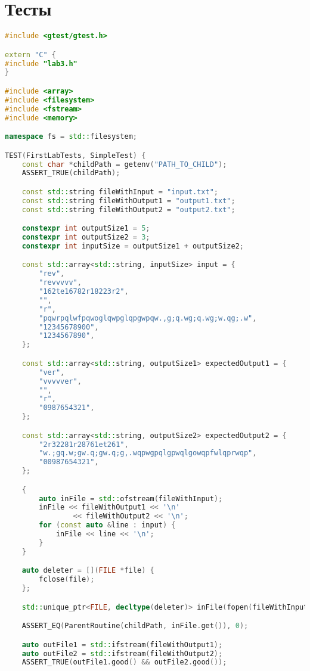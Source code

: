 \documentclass[a4paper, 12pt]{article}
\begin{document}
\newpage
\section{Тесты}
\begin{lstlisting}[language=C++]
#include <gtest/gtest.h>

extern "C" {
#include "lab3.h"
}

#include <array>
#include <filesystem>
#include <fstream>
#include <memory>

namespace fs = std::filesystem;

TEST(FirstLabTests, SimpleTest) {
    const char *childPath = getenv("PATH_TO_CHILD");
    ASSERT_TRUE(childPath);

    const std::string fileWithInput = "input.txt";
    const std::string fileWithOutput1 = "output1.txt";
    const std::string fileWithOutput2 = "output2.txt";

    constexpr int outputSize1 = 5;
    constexpr int outputSize2 = 3;
    constexpr int inputSize = outputSize1 + outputSize2;

    const std::array<std::string, inputSize> input = {
        "rev",
        "revvvvv",
        "162te16782r18223r2",
        "",
        "r",
        "pqwrpqlwfpqwoglqwpglqpgwpqw.,g;q.wg;q.wg;w.qg;.w",
        "12345678900",
        "1234567890",
    };

    const std::array<std::string, outputSize1> expectedOutput1 = {
        "ver",
        "vvvvver",
        "",
        "r",
        "0987654321",
    };

    const std::array<std::string, outputSize2> expectedOutput2 = {
        "2r32281r28761et261",
        "w.;gq.w;gw.q;gw.q;g,.wqpwgpqlgpwqlgowqpfwlqprwqp",
        "00987654321",
    };

    {
        auto inFile = std::ofstream(fileWithInput);
        inFile << fileWithOutput1 << '\n'
                << fileWithOutput2 << '\n';
        for (const auto &line : input) {
            inFile << line << '\n';
        }
    }

    auto deleter = [](FILE *file) {
        fclose(file);
    };

    std::unique_ptr<FILE, decltype(deleter)> inFile(fopen(fileWithInput.c_str(), "r"), deleter);

    ASSERT_EQ(ParentRoutine(childPath, inFile.get()), 0);

    auto outFile1 = std::ifstream(fileWithOutput1);
    auto outFile2 = std::ifstream(fileWithOutput2);
    ASSERT_TRUE(outFile1.good() && outFile2.good());


\end{lstlisting}
\end{document}
